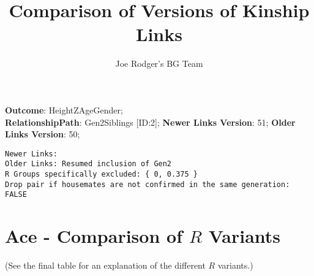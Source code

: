 \documentclass{article}\usepackage{graphicx, color}
\title{Comparison of Versions of Kinship Links}
\author{Joe Rodger's BG Team}
\makeatletter
\newenvironment{kframe}{%
 \def\at@end@of@kframe{}%
 \ifinner\ifhmode%
  \def\at@end@of@kframe{\end{minipage}}%
  \begin{minipage}{\columnwidth}%
 \fi\fi%
 \def\FrameCommand##1{\hskip\@totalleftmargin \hskip-\fboxsep
 \colorbox{shadecolor}{##1}\hskip-\fboxsep
     \hskip-\linewidth \hskip-\@totalleftmargin \hskip\columnwidth}%
 \MakeFramed {\advance\hsize-\width
   \@totalleftmargin\z@ \linewidth\hsize
   \@setminipage}}%
 {\par\unskip\endMakeFramed%
 \at@end@of@kframe}
\newenvironment{knitrout}{}{} %
\makeatother
\begin{document}
\maketitle
\setcounter{totalnumber}{8} %

\setlength{\parindent}{0pt}%







\textbf{Outcome}: HeightZAgeGender;\\
\textbf{RelationshipPath}: Gen2Siblings [ID:2];
\textbf{Newer Links Version}: 51;
\textbf{Older Links Version}: 50;

\begin{knitrout}
\color{fgcolor}\begin{kframe}
\begin{verbatim}
Newer Links:
Older Links: Resumed inclusion of Gen2
R Groups specifically excluded: { 0, 0.375 }
Drop pair if housemates are not confirmed in the same generation: FALSE\end{verbatim}
\end{kframe}
\end{knitrout}





\section{Ace - Comparison of $R$ Variants} 
(See the final table for an explanation of the different $R$ variants.)
\end{document}
